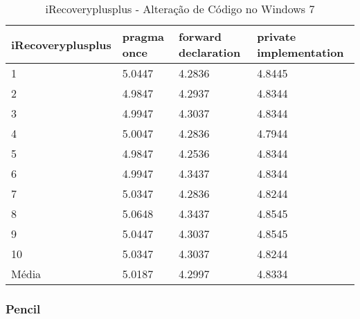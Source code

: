 \begin{table}[!h]
\centering
\caption{iRecoveryplusplus - Alteração de Código no Windows 7}
\label{tab:alteracao_de_codigo:windows:irecovery}
\begin{tabular}{llll}
\textbf{iRecoveryplusplus} & \textbf{pragma once} & \textbf{forward declaration} & \textbf{private implementation}   \\ \toprule
1                                    & 5.0447  & 4.2836  & 4.8445 \\ 
2                                    & 4.9847  & 4.2937  & 4.8344 \\ 
3                                    & 4.9947  & 4.3037  & 4.8344 \\ 
4                                    & 5.0047  & 4.2836  & 4.7944 \\ 
5                                    & 4.9847  & 4.2536  & 4.8344 \\ 
6                                    & 4.9947  & 4.3437  & 4.8344 \\ 
7                                    & 5.0347  & 4.2836  & 4.8244 \\ 
8                                    & 5.0648  & 4.3437  & 4.8545 \\ 
9                                    & 5.0447  & 4.3037  & 4.8545 \\ 
10                                   & 5.0347  & 4.3037  & 4.8244 \\ \bottomrule
Média                                & 5.0187  & 4.2997  & 4.8334 \\ 
\end{tabular}
\end{table}

\clearpage
\subsubsection*{Pencil}

